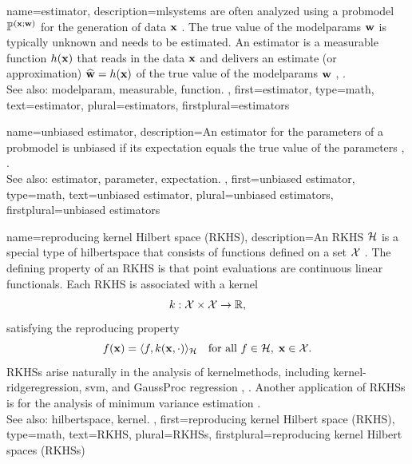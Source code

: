 {name={estimator},
	description={\Glspl{mlsystem} are often analyzed using a 
		\gls{probmodel} $\mathbb{P}^{({\bf x};{\bf w})}$ for the 
		generation of \gls{data} ${\bf x}$ \cite{MLBasics}. The true 
		value of the \glspl{modelparam} ${\bf w}$ is typically unknown and needs 
		to be estimated. An estimator is a \gls{measurable} \gls{function} 
		$h({\bf x})$ that reads in the \gls{data} ${\bf x}$ 
		and delivers an estimate (or approximation) $\widehat{{\bf w}} = h({\bf x})$ 
		of the true value of the \glspl{modelparam} ${\bf w}$ \cite{LC},  \cite{kay}.
		\\
		See also: \gls{modelparam}, \gls{measurable}, \gls{function}. },
	first={estimator},
	type=math,
	text={estimator},
	plural={estimators},
	firstplural={estimators}
}

{name={unbiased estimator},
	description={An \gls{estimator} for the \glspl{parameter} of a \gls{probmodel} 
	    	is unbiased if its \gls{expectation} equals the true value of the \glspl{parameter} \cite{LC}, \cite{kay}.
		\\
		See also: \gls{estimator}, \gls{parameter}, \gls{expectation}. },
	first={unbiased estimator},
	type=math,
	text={unbiased estimator},
	plural={unbiased estimators},
	firstplural={unbiased estimators}
}

{name={reproducing kernel Hilbert space (RKHS)},
	description={An RKHS $\mathcal{H}$ is a  
		special type of \gls{hilbertspace} that consists of 
 		\glspl{function} defined on a set $\mathcal{X}$ \cite{aronszajn1950}. 
 		The defining property of an RKHS is that point evaluations are continuous 
 		linear functionals. Each RKHS is associated with a \gls{kernel} 
  		$$k :\mathcal{X} \times\mathcal{X}\to\mathbb{R},$$ 
 		satisfying the reproducing property
 		\[
 			f({\bf x})=\langle f, k({\bf x},\cdot)\rangle_{\mathcal{H}}
 			\quad \text{for all } f\in\mathcal{H},\; {\bf x}\in\mathcal{X} .
 		\]
 		RKHSs arise naturally in the analysis of \glspl{kernelmethod}, 
 		including \gls{kernel}-\gls{ridgeregression}, \gls{svm}, and \gls{GaussProc} 
 		\gls{regression} \cite{Murphy2012}, \cite{LearningKernelsBook}. Another application of 
		RKHSs is for the analysis of \gls{minimum} \gls{variance} estimation \cite{RKHSExpFamIT2012}.
		\\
		See also: \gls{hilbertspace}, \gls{kernel}. }, 
 	first={reproducing kernel Hilbert space (RKHS)},
 	type=math,
 	text={RKHS}, 
 	plural={RKHSs},
 	firstplural={reproducing kernel Hilbert spaces (RKHSs)}
}

